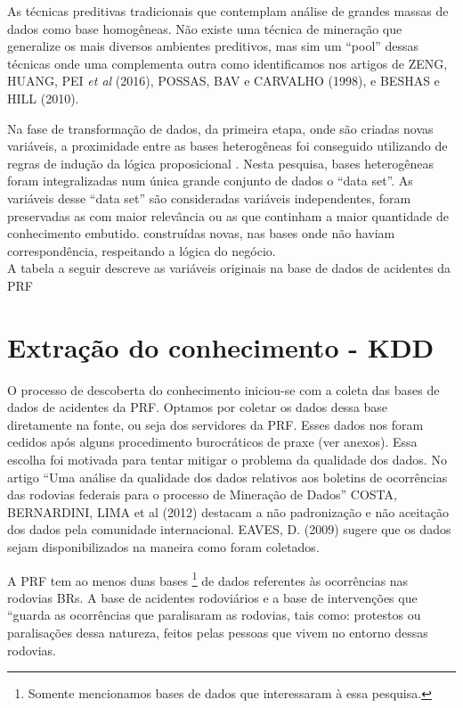 As técnicas preditivas tradicionais que contemplam análise de grandes massas de dados como base homogêneas.
Não existe uma técnica de mineração que generalize os mais diversos ambientes preditivos, mas sim um ``pool'' 
dessas técnicas onde uma complementa outra como identificamos nos artigos de ZENG, HUANG, PEI \textit{et al} (2016), 
POSSAS, BAV e CARVALHO (1998), e BESHAS e HILL (2010).


Na fase de transformação de dados, da primeira etapa, onde são criadas novas variáveis, a proximidade entre as
bases heterogêneas foi conseguido utilizando de regras de indução da lógica proposicional \cite{NorvigRussel2004}.
Nesta pesquisa, bases heterogêneas foram integralizadas num única grande conjunto de dados o ``data set''. As variáveis desse ``data set''
são consideradas variáveis independentes, foram preservadas as com maior relevância ou as que continham a maior quantidade de conhecimento
embutido.  construídas novas, nas bases onde não haviam correspondência, respeitando a lógica do negócio.\\
A tabela a seguir descreve as variáveis originais na base de dados de acidentes da PRF 

\pagebreak

\section{Extração do conhecimento - KDD}

O processo de descoberta do conhecimento iniciou-se com a coleta das bases de dados de acidentes da PRF. Optamos por coletar os dados dessa base diretamente na fonte,
ou seja dos servidores da PRF. Esses dados nos foram cedidos após alguns procedimento burocráticos de praxe (ver anexos). Essa escolha foi motivada para tentar
mitigar o problema da qualidade dos dados. No artigo ``Uma análise da qualidade dos dados relativos aos boletins de ocorrências das rodovias federais para o processo de Mineração de Dados'' COSTA, BERNARDINI, LIMA et al (2012) destacam a não padronização e não aceitação dos dados pela comunidade internacional. EAVES, D. (2009) sugere que os dados sejam disponibilizados na maneira como foram coletados.

A PRF tem ao menos duas bases \footnote{Somente mencionamos bases de dados que interessaram à essa pesquisa.} de dados referentes às ocorrências nas rodovias BRs. A base de acidentes rodoviários e a base de intervenções que ``guarda as ocorrências que paralisaram as rodovias, tais como: protestos ou paralisações dessa natureza, feitos pelas pessoas que vivem no entorno dessas rodovias.

